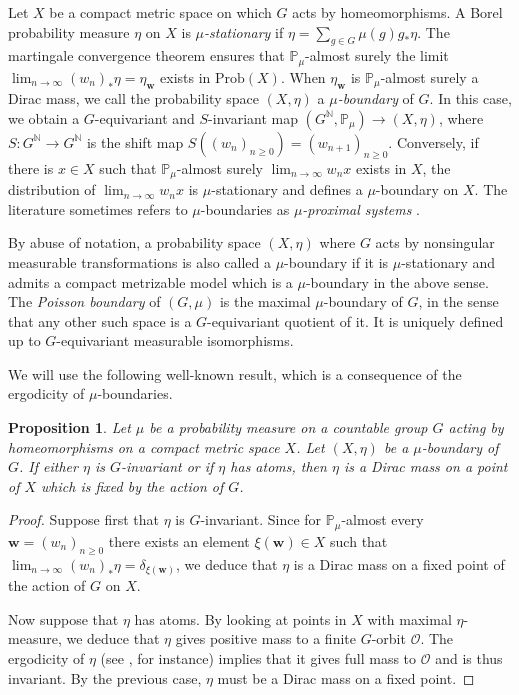 \documentclass[reqno,a4paper,11pt]{amsart}
\numberwithin{equation}{section}
\newcommand{\1}{\mathbf{1}}
\def\N{{\mathbb N}}
\def\P{{\mathbb P}}
\def\cO{{\mathcal O}}
\newtheorem{prop}[teo]{Proposition}
\theoremstyle{definition}
\begin{document}
Let $X$ be a compact metric space on which $G$ acts by homeomorphisms. A Borel probability measure $\eta$ on $X$ is \emph{$\mu$-stationary} if $\eta = \sum_{g \in G}\mu(g)g_\ast \eta$. The martingale convergence theorem ensures that $\P_{\mu}$-almost surely the limit $\lim_{n \to \infty} (w_n)_\ast \eta = \eta_\mathbf{w}$ exists in $\mathrm{Prob}(X)$. When $\eta_\mathbf{w}$ is $\P_{\mu}$-almost surely a Dirac mass, we call the probability space $(X, \eta)$ a \emph{$\mu$-boundary} of $G$. In this case, we obtain a $G$-equivariant and $S$-invariant map $(G^\N, \P_\mu) \to (X, \eta)$, where $S \colon G^\N \to G^\N$ is the shift map $S((w_n)_{n \geq 0}) = (w_{n+1})_{n \geq 0}$. Conversely, if there is $x \in X$ such that $\P_\mu$-almost surely $\lim_{n \to \infty} w_nx$ exists in $X$, the distribution of $\lim_{n \to \infty} w_nx$ is $\mu$-stationary and defines a $\mu$-boundary on $X$. The literature sometimes refers to $\mu$-boundaries as \emph{$\mu$-proximal systems} \cite{FurstenbergGlasner2010}.

By abuse of notation, a probability space $(X,\eta)$ where $G$ acts by nonsingular measurable transformations is also called a $\mu$-boundary if it is $\mu$-stationary and admits a compact metrizable model which is a $\mu$-boundary in the above sense. The \emph{Poisson boundary} of $(G,\mu)$ is the maximal $\mu$-boundary of $G$, in the sense that any other such space is a $G$-equivariant quotient of it. It is uniquely defined up to $G$-equivariant measurable isomorphisms.

We will use the following well-known result, which is a consequence of the ergodicity of $\mu$-boundaries.
\begin{prop}\label{prop: invariant is delta}
	Let $\mu$ be a probability measure on a countable group $G$ acting by homeomorphisms on a compact metric space $X$. Let $(X,\eta)$ be a $\mu$-boundary of $G$. If either $\eta$ is $G$-invariant or if $\eta$ has atoms, then $\eta$ is a Dirac mass on a point of $X$ which is fixed by the action of $G$.
\end{prop}
\begin{proof}
	Suppose first that $\eta$ is $G$-invariant. Since for $\P_{\mu}$-almost every $\mathbf{w}=(w_n)_{n\ge 0}$ there exists an element $\xi(\mathbf{w}) \in X$ such that $\lim_{n \to \infty}(w_n)_\ast \eta = \delta_{\xi(\mathbf{w})}$, we deduce that $\eta$ is a Dirac mass on a fixed point of the action of $G$ on $X$.
	
	Now suppose that $\eta$ has atoms. By looking at points in $X$ with maximal $\eta$-measure, we deduce that $\eta$ gives positive mass to a finite $G$-orbit $\cO$. The ergodicity of $\eta$ (see \cite[Section 2]{Jaworski1994}, for instance) implies that it gives full mass to $\cO$ and is thus invariant. By the previous case, $\eta$ must be a Dirac mass on a fixed point.
\end{proof}
\end{document}
